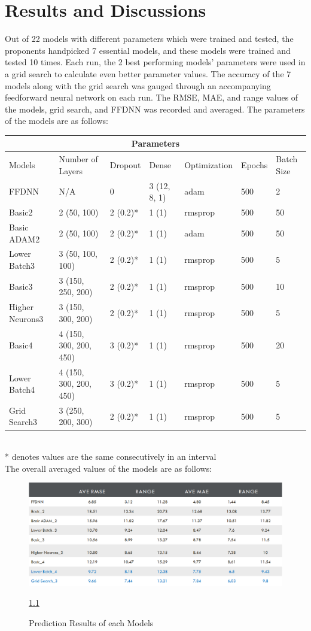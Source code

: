 \documentclass[10pt,11pt,12pt,oneside]{book}
\begin{document}
\chapter{Results and Discussions}    
Out of 22 models with different parameters which were trained and tested, the proponents handpicked 7 essential models, and these models were trained and tested 10 times. Each run, the 2 best performing models’ parameters were used in a grid search to calculate even better parameter values. The accuracy of the 7 models along with the grid search was gauged through an accompanying feedforward neural network on each run. The RMSE, MAE, and range values of the models, grid search, and FFDNN was recorded and averaged. The parameters of the models are as follows:

\begin{tabular}{ |p{2cm}||p{2.5cm}|p{1.5cm}|p{1.5cm}| p{2.5cm} | p{1.5cm}| p{1.5cm} |   }
 \hline
 \multicolumn{7}{|c|}{Parameters} \\
 \hline
Models & Number of Layers & Dropout & Dense & Optimization & Epochs & Batch Size\\
 \hline
 FFDNN & N/A & 0 & 3 (12, 8, 1) & adam & 500 & 2\\
 \hline
 Basic2 & 2 (50, 100) & 2 (0.2)* & 1 (1) & rmsprop & 500 & 50\\
 \hline
 Basic ADAM2 & 2 (50, 100) & 2 (0.2)* & 1 (1) & adam & 500 & 50\\
 \hline
 Lower Batch3 & 3 (50, 100, 100) & 2 (0.2)* & 1 (1) & rmsprop & 500 & 5\\
 \hline
 Basic3 & 3 (150, 250, 200) & 2 (0.2)* & 1 (1) & rmsprop & 500 & 10\\
 \hline
Higher Neurons3 & 3 (150, 300, 200) & 2 (0.2)* & 1 (1) & rmsprop & 500 & 5\\
 \hline
 Basic4 & 4 (150, 300, 200, 450) & 3 (0.2)* & 1 (1) & rmsprop & 500 & 20\\
 \hline
 Lower Batch4 & 4 (150, 300, 200, 450) & 3 (0.2)* & 1 (1) & rmsprop & 500 & 5\\
 \hline
 Grid Search3 & 3 (250, 200, 300) & 2 (0.2)* & 1 (1) & rmsprop & 500 & 5\\
 \hline
 
 
 \hline
\end{tabular}
    \\ * denotes values are the same consecutively in an interval\\
    The overall averaged values of the models are as follows:
    \begin{figure}
         \includegraphics[width=\linewidth]{results.png}
         \caption{Prediction Results of each Models}
         \label{fig:results}
         \ref{fig:results}
\end{figure}
\end{document}

